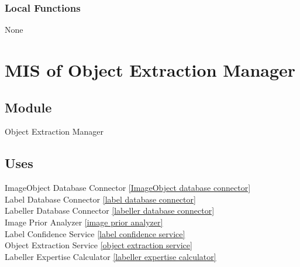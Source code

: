 \documentclass[12pt, titlepage]{article}
\begin{document}
  
  
  \subsubsection{Local Functions}

  None
  

\newpage



\section{MIS of Object Extraction Manager }\label{object extraction manager}
  
  
  
  \subsection{Module}
  
  Object Extraction Manager
  
  \subsection{Uses}
  
  ImageObject Database Connector \ref{ImageObject database connector}\\
  Label Database Connector \ref{label database connector}\\
  Labeller Database Connector \ref{labeller database connector}\\
  Image Prior Analyzer \ref{image prior analyzer}\\
  Label Confidence Service \ref{label confidence service}\\
  Object Extraction Service \ref{object extraction service}\\
  Labeller Expertise Calculator \ref{labeller expertise calculator}\\
\end{document}
